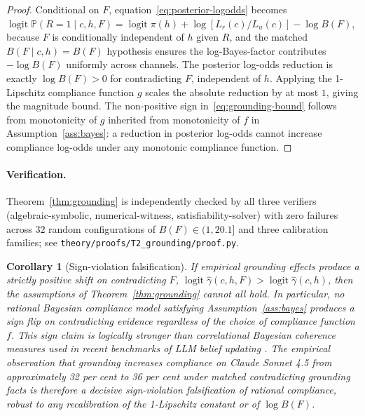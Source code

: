 \documentclass[11pt]{article}
\newtheorem{corollary}{Corollary}
\theoremstyle{definition}
\theoremstyle{remark}
\begin{document}
\begin{proof}
Conditional on $F$, equation~\eqref{eq:posterior-logodds} becomes
$\operatorname{logit} \mathbb{P}(R=1 \mid c, h, F) = \operatorname{logit} \pi(h) + \log[L_r(c)/L_u(c)] - \log B(F)$,
because $F$ is conditionally independent of $h$ given $R$, and the matched
$B(F \mid c, h) = B(F)$ hypothesis ensures the log-Bayes-factor contributes
$-\log B(F)$ uniformly across channels. The posterior log-odds reduction is exactly
$\log B(F) > 0$ for contradicting $F$, independent of $h$. Applying the 1-Lipschitz
compliance function $g$ scales the absolute reduction by at most $1$, giving the
magnitude bound. The non-positive sign in~\eqref{eq:grounding-bound} follows from
monotonicity of $g$ inherited from monotonicity of $f$ in
Assumption~\ref{ass:bayes}: a reduction in posterior log-odds cannot increase
compliance log-odds under any monotonic compliance function.
\end{proof}

\paragraph{Verification.} Theorem~\ref{thm:grounding} is independently checked
by all three verifiers (algebraic-symbolic, numerical-witness, satisfiability-solver) with zero failures across $32$ random
configurations of $B(F) \in (1, 20.1]$ and three calibration families; see
\texttt{theory/proofs/T2\_grounding/proof.py}.

\begin{corollary}[Sign-violation falsification]
\label{cor:grounding-sign}
If empirical grounding effects produce a strictly positive shift on contradicting $F$,
$\operatorname{logit} \hat\gamma(c, h, F) > \operatorname{logit} \hat\gamma(c, h)$, then
the assumptions of Theorem~\ref{thm:grounding} cannot all hold. In particular,
no rational Bayesian compliance model satisfying Assumption~\ref{ass:bayes} produces
a sign flip on contradicting evidence regardless of the choice of compliance
function $f$. This sign claim is logically stronger than correlational Bayesian
coherence measures used in recent benchmarks of LLM belief updating
\cite{imran2025bayes}. The empirical observation that grounding \emph{increases}
compliance on Claude Sonnet 4.5 from approximately 32 per cent to 36 per cent
under matched contradicting grounding facts is therefore a decisive sign-violation
falsification of rational compliance, robust to any recalibration of the
1-Lipschitz constant or of $\log B(F)$.
\end{corollary}
\end{document}
